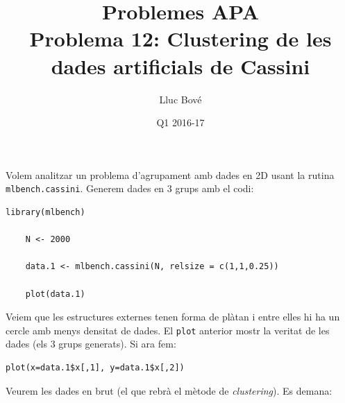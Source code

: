 \documentclass[a4paper]{article}
\title{Problemes APA \\ Problema 12: Clustering de les dades artificials de Cassini}
\author{Lluc Bové}
\date{Q1 2016-17}
\begin{document}
\maketitle

Volem analitzar un problema d'agrupament amb dades en 2D usant la rutina \lstinline{mlbench.cassini}. Generem dades en 3 grups amb el codi:\\

\begin{lstlisting}[frame=none,numbers=none]
	library(mlbench)
	
	N <- 2000
	
	data.1 <- mlbench.cassini(N, relsize = c(1,1,0.25))
	
	plot(data.1)
\end{lstlisting}
 
 Veiem que les estructures externes tenen forma de plàtan i entre elles hi ha un cercle amb menys densitat de dades. El \lstinline|plot| anterior mostr la veritat de les dades (els $3$ grups generats). Si ara fem:
 
 \begin{lstlisting}[frame=none,numbers=none]
plot(x=data.1$x[,1], y=data.1$x[,2])
 \end{lstlisting}
 
 Veurem les dades en brut (el que rebrà el mètode de \textit{clustering}). Es demana:
 
\end{document}
